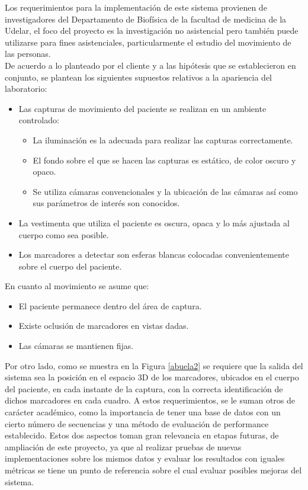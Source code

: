 Los requerimientos para la implementación de este sistema provienen de investigadores del Departamento de Biofísica de la facultad de medicina de la Udelar, el foco del proyecto es la investigación no asistencial pero también puede utilizarse para fines asistenciales, particularmente el estudio del movimiento de las personas.
\\ 

De acuerdo a lo planteado por el cliente y a las hipótesis que se establecieron en conjunto, se plantean los siguientes supuestos relativos a la apariencia del laboratorio:
\begin{itemize}
\item Las capturas de movimiento del paciente se realizan en un ambiente controlado:\vspace{-0.2cm}
	\begin{itemize}
		 \item La iluminación es la adecuada para realizar las  capturas correctamente.
		 \item El fondo sobre el que se hacen las capturas es estático, de color oscuro y opaco.		 
		 \item Se utiliza cámaras convencionales y la ubicación de las cámaras así como sus parámetros de interés son conocidos.
	\end{itemize}
	\vspace{-0.2cm}
\item La vestimenta que utiliza el paciente es oscura, opaca y lo más ajustada al cuerpo como sea posible.\vspace{-0.1cm}
\item Los marcadores a detectar son esferas blancas colocadas convenientemente sobre el cuerpo del paciente.
\end{itemize}

En cuanto al movimiento se asume que:
\begin{itemize}
\item El paciente permanece dentro del área de captura.\vspace{-0.1cm}
\item Existe oclusión de marcadores en vistas dadas.\vspace{-0.1cm}
\item Las cámaras se mantienen fijas.
\end{itemize}

Por otro lado, como se muestra en la Figura \ref{abuela2} se requiere que la salida del sistema sea la posición en el espacio 3D de los marcadores, ubicados en el cuerpo del paciente, en cada instante de la captura, con la correcta identificación de dichos marcadores en cada cuadro. A estos requerimientos, se le suman otros de carácter académico, como la importancia de tener una base de datos con un cierto número de secuencias y una método de evaluación de performance establecido. Estos dos aspectos toman gran relevancia en etapas futuras, de ampliación de este proyecto, ya que al realizar pruebas  de nuevas implementaciones sobre los mismos datos y evaluar los resultados con iguales métricas se tiene un punto de referencia sobre el cual evaluar posibles mejoras del sistema.
\\ 

